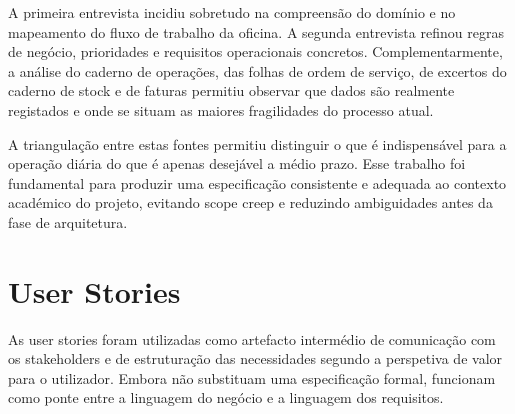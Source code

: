 \documentclass[a4paper,12pt]{scrreprt}
\begin{document}
        A primeira entrevista incidiu sobretudo na compreensão do domínio e no mapeamento do fluxo de trabalho da oficina. A segunda entrevista refinou regras de negócio, prioridades e requisitos operacionais concretos. Complementarmente, a análise do caderno de operações, das folhas de ordem de serviço, de excertos do caderno de stock e de faturas permitiu observar que dados são realmente registados e onde se situam as maiores fragilidades do processo atual.

        A triangulação entre estas fontes permitiu distinguir o que é indispensável para a operação diária do que é apenas desejável a médio prazo. Esse trabalho foi fundamental para produzir uma especificação consistente e adequada ao contexto académico do projeto, evitando scope creep e reduzindo ambiguidades antes da fase de arquitetura.

    \section{User Stories}
        As user stories foram utilizadas como artefacto intermédio de comunicação com os stakeholders e de estruturação das necessidades segundo a perspetiva de valor para o utilizador. Embora não substituam uma especificação formal, funcionam como ponte entre a linguagem do negócio e a linguagem dos requisitos.
\end{document}
